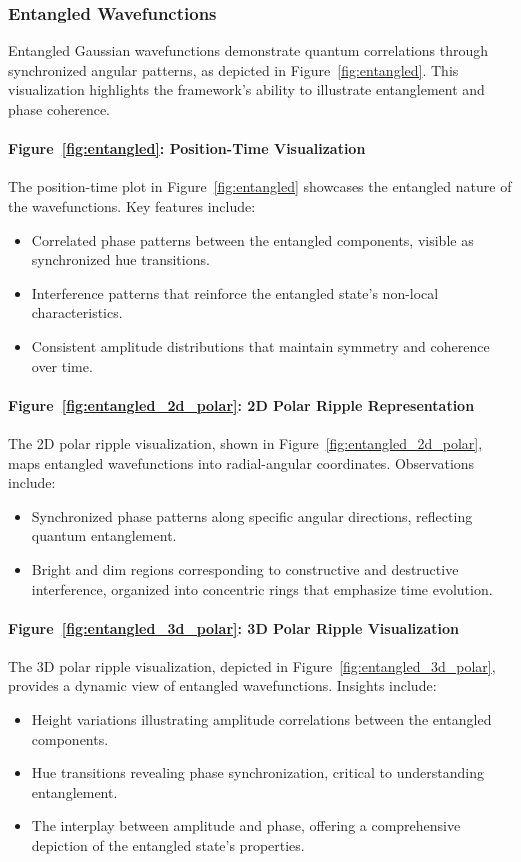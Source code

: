 \documentclass[12pt]{article}
\begin{document}
\subsubsection{Entangled Wavefunctions}
Entangled Gaussian wavefunctions demonstrate quantum correlations through synchronized angular patterns, as depicted in Figure~\ref{fig:entangled}. This visualization highlights the framework's ability to illustrate entanglement and phase coherence.

\paragraph{Figure~\ref{fig:entangled}: Position-Time Visualization}
The position-time plot in Figure~\ref{fig:entangled} showcases the entangled nature of the wavefunctions. Key features include:
\begin{itemize}
    \item Correlated phase patterns between the entangled components, visible as synchronized hue transitions.
    \item Interference patterns that reinforce the entangled state’s non-local characteristics.
    \item Consistent amplitude distributions that maintain symmetry and coherence over time.
\end{itemize}

\paragraph{Figure~\ref{fig:entangled_2d_polar}: 2D Polar Ripple Representation}
The 2D polar ripple visualization, shown in Figure~\ref{fig:entangled_2d_polar}, maps entangled wavefunctions into radial-angular coordinates. Observations include:
\begin{itemize}
    \item Synchronized phase patterns along specific angular directions, reflecting quantum entanglement.
    \item Bright and dim regions corresponding to constructive and destructive interference, organized into concentric rings that emphasize time evolution.
\end{itemize}

\paragraph{Figure~\ref{fig:entangled_3d_polar}: 3D Polar Ripple Visualization}
The 3D polar ripple visualization, depicted in Figure~\ref{fig:entangled_3d_polar}, provides a dynamic view of entangled wavefunctions. Insights include:
\begin{itemize}
    \item Height variations illustrating amplitude correlations between the entangled components.
    \item Hue transitions revealing phase synchronization, critical to understanding entanglement.
    \item The interplay between amplitude and phase, offering a comprehensive depiction of the entangled state’s properties.
\end{itemize}
\end{document}
